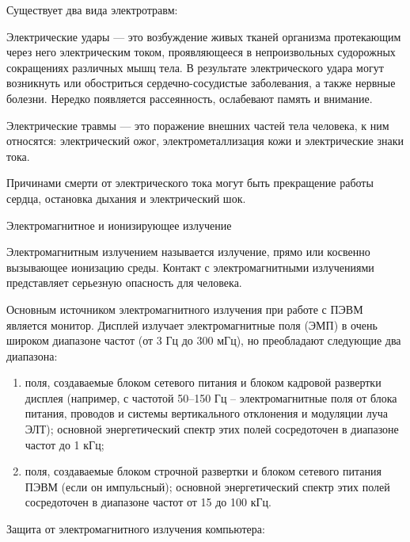 Существует два вида электротравм:

Электрические удары --- это возбуждение живых тканей организма протекающим через него электрическим током, проявляющееся в непроизвольных судорожных сокращениях различных мышц тела.
В результате электрического удара могут возникнуть или обостриться сердечно-сосудистые заболевания, а также нервные болезни.
Нередко появляется рассеянность, ослабевают память и внимание.

Электрические травмы --- это поражение внешних частей тела человека, к ним относятся: электрический ожог, электрометаллизация кожи и электрические знаки тока.

Причинами смерти от электрического тока могут быть прекращение работы сердца, остановка дыхания и электрический шок.

\point Электромагнитное и ионизирующее излучение

Электромагнитным излучением называется излучение, прямо или косвенно вызывающее ионизацию среды.
Контакт с электромагнитными излучениями представляет серьезную опасность для человека.

Основным источником электромагнитного излучения при работе с ПЭВМ является монитор.
Дисплей излучает электромагнитные поля (ЭМП) в очень широком диапазоне частот (от 3 Гц до 300 мГц), но преобладают следующие два диапазона:

\begin{enumerate}
	\item поля, создаваемые блоком сетевого питания и блоком кадровой развертки дисплея (например, с частотой 50–150 Гц – электромагнитные поля от блока питания, проводов и системы вертикального отклонения и модуляции луча ЭЛТ); основной энергетический спектр этих полей сосредоточен в диапазоне частот до 1 кГц;
	\item поля, создаваемые блоком строчной развертки и блоком сетевого питания ПЭВМ (если он импульсный); основной энергетический спектр этих полей сосредоточен в диапазоне частот от 15 до 100 кГц.
\end{enumerate}

Защита от электромагнитного излучения компьютера: 

